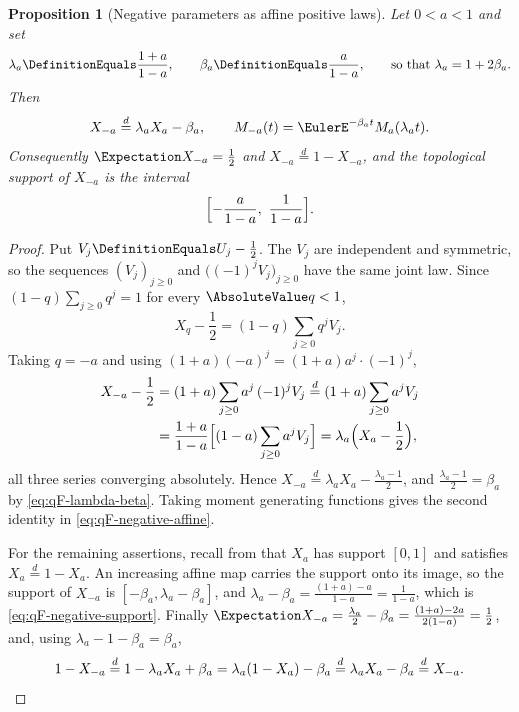 \documentclass[11pt,a4paper,oneside,openany]{book}
\newtheorem{proposition}[proposition]{Proposition}
\theoremstyle{definition}
\theoremstyle{remark}
\begin{document}
\begin{proposition}[Negative parameters as affine positive laws]\label{prop:qF-negative-affine}
Let $0<a<1$ and set
\begin{equation}\label{eq:qF-lambda-beta}
 \lambda_a\DefinitionEquals\frac{1+a}{1-a},
 \qquad
 \beta_a\DefinitionEquals\frac{a}{1-a},
 \qquad\text{so that }\lambda_a=1+2\beta_a.
\end{equation}
Then
\begin{equation}\label{eq:qF-negative-affine}
 X_{-a}\overset d=\lambda_aX_a-\beta_a,
 \qquad
 M_{-a}(t)=\EulerE^{-\beta_at}M_a(\lambda_at).
\end{equation}
Consequently $\Expectation X_{-a}=\tfrac12$ and $X_{-a}\overset d=1-X_{-a}$, and the
topological support of $X_{-a}$ is the interval
\begin{equation}\label{eq:qF-negative-support}
 \Bigl[-\frac a{1-a},\ \frac1{1-a}\Bigr].
\end{equation}
\end{proposition}

\begin{proof}
Put $V_j\DefinitionEquals U_j-\tfrac12$.  The $V_j$ are independent and symmetric, so the
sequences $(V_j)_{j\ge0}$ and $\bigl((-1)^jV_j\bigr)_{j\ge0}$ have the same
joint law.  Since $(1-q)\sum_{j\ge0}q^j=1$ for every $\AbsoluteValue q<1$,
\[
 X_q-\frac12=(1-q)\sum_{j\ge0}q^jV_j .
\]
Taking $q=-a$ and using $(1+a)(-a)^j=(1+a)a^j\cdot(-1)^j$,
\begin{align*}
 X_{-a}-\frac12
 &=(1+a)\sum_{j\ge0}a^j\,(-1)^jV_j
 \overset d=(1+a)\sum_{j\ge0}a^jV_j\\
 &=\frac{1+a}{1-a}\Bigl[(1-a)\sum_{j\ge0}a^jV_j\Bigr]
 =\lambda_a\Bigl(X_a-\frac12\Bigr),
\end{align*}
all three series converging absolutely.  Hence
$X_{-a}\overset d=\lambda_aX_a-\tfrac{\lambda_a-1}2$, and
$\tfrac{\lambda_a-1}2=\beta_a$ by \eqref{eq:qF-lambda-beta}.  Taking moment
generating functions gives the second identity in
\eqref{eq:qF-negative-affine}.

For the remaining assertions, recall from 
that $X_a$ has support $[0,1]$ and satisfies $X_a\overset d=1-X_a$.  An
increasing affine map carries the support onto its image, so the support of
$X_{-a}$ is $[-\beta_a,\lambda_a-\beta_a]$, and
$\lambda_a-\beta_a=\frac{(1+a)-a}{1-a}=\frac1{1-a}$, which is
\eqref{eq:qF-negative-support}.  Finally
$\Expectation X_{-a}=\tfrac{\lambda_a}2-\beta_a=\frac{(1+a)-2a}{2(1-a)}=\tfrac12$,
and, using $\lambda_a-1-\beta_a=\beta_a$,
\[
 1-X_{-a}\overset d=1-\lambda_aX_a+\beta_a
 =\lambda_a(1-X_a)-\beta_a
 \overset d=\lambda_aX_a-\beta_a
 \overset d=X_{-a}. \qedhere
\]
\end{proof}
\end{document}
